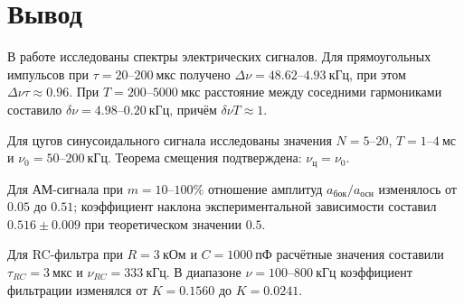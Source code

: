 \documentclass[14pt,a4paper]{extarticle}
\begin{document}
\section*{Вывод}

В работе исследованы спектры электрических сигналов. Для прямоугольных
импульсов при $\tau=20\text{--}200~\text{мкс}$ получено
$\Delta\nu=48{.}62\text{--}4{.}93~\text{кГц}$, при этом
$\Delta\nu\tau\approx0{.}96$. При $T=200\text{--}5000~\text{мкс}$
расстояние между соседними гармониками составило
$\delta\nu=4{.}98\text{--}0{.}20~\text{кГц}$, причём
$\delta\nu T\approx1$.

Для цугов синусоидального сигнала исследованы значения
$N=5\text{--}20$, $T=1\text{--}4~\text{мс}$ и
$\nu_0=50\text{--}200~\text{кГц}$. Теорема смещения подтверждена:
$\nu_{\text{ц}}=\nu_0$.

Для АМ-сигнала при $m=10\text{--}100\%$ отношение амплитуд
$a_{\text{бок}}/a_{\text{осн}}$ изменялось от $0{.}05$ до $0{.}51$;
коэффициент наклона экспериментальной зависимости составил
$0{.}516\pm0{.}009$ при теоретическом значении $0{.}5$.

Для RC-фильтра при $R=3~\text{кОм}$ и $C=1000~\text{пФ}$ расчётные
значения составили $\tau_{RC}=3~\text{мкс}$ и
$\nu_{RC}=333~\text{кГц}$. В диапазоне $\nu=100\text{--}800~\text{кГц}$
коэффициент фильтрации изменялся от $K=0{.}1560$ до $K=0{.}0241$.
\end{document}
